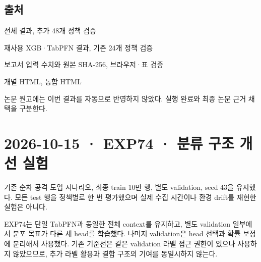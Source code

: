 \subsection{출처}
\par\noindent \textbullet\enspace 전체 결과, 추가 48개 정책 검증


\par\noindent \textbullet\enspace 재사용 XGB·TabPFN 결과, 기존 24개 정책 검증


\par\noindent \textbullet\enspace 보고서 입력 수치와 원본 SHA-256, 브라우저·표 검증


\par\noindent \textbullet\enspace 개별 HTML, 통합 HTML


논문 원고에는 이번 결과를 자동으로 반영하지 않았다. 실행 완료와 최종 논문 근거 채택을 구분한다.



\section{2026-10-15 · EXP74 · 분류 구조 개선 실험}
\label{report:20261015_exp74_results}
기존 순차 공격 도입 시나리오, 최종 train 10만 행, 별도 validation, seed 43을 유지했다. 모든 test 행을 정책별로 한 번 평가했으며 실제 수집 시간이나 환경 drift를 재현한 실험은 아니다.

EXP74는 단일 TabPFN과 동일한 전체 context를 유지하고, 별도 validation 일부에서 분포 목표가 다른 세 head를 학습했다. 나머지 validation은 head 선택과 확률 보정에 분리해서 사용했다. 기존 기준선은 같은 validation 라벨 접근 권한이 있으나 사용하지 않았으므로, 추가 라벨 활용과 결합 구조의 기여를 동일시하지 않는다.

